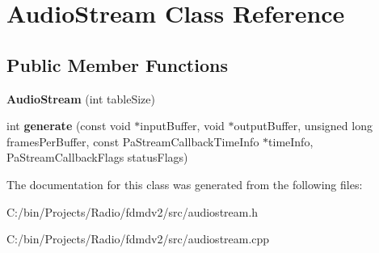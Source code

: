 \hypertarget{class_audio_stream}{\section{Audio\-Stream Class Reference}
\label{class_audio_stream}
}
\subsection*{Public Member Functions}
\begin{DoxyCompactItemize}
\item 
\hypertarget{class_audio_stream_a1e253941ff189daa6ae1ebdd4658b943}{{\bfseries Audio\-Stream} (int table\-Size)}\label{class_audio_stream_a1e253941ff189daa6ae1ebdd4658b943}

\item 
\hypertarget{class_audio_stream_a1abd5e1c5f7fe05fc66c52603818fc5f}{int {\bfseries generate} (const void $\ast$input\-Buffer, void $\ast$output\-Buffer, unsigned long frames\-Per\-Buffer, const Pa\-Stream\-Callback\-Time\-Info $\ast$time\-Info, Pa\-Stream\-Callback\-Flags status\-Flags)}\label{class_audio_stream_a1abd5e1c5f7fe05fc66c52603818fc5f}

\end{DoxyCompactItemize}


The documentation for this class was generated from the following files\-:\begin{DoxyCompactItemize}
\item 
C\-:/bin/\-Projects/\-Radio/fdmdv2/src/audiostream.\-h\item 
C\-:/bin/\-Projects/\-Radio/fdmdv2/src/audiostream.\-cpp\end{DoxyCompactItemize}
